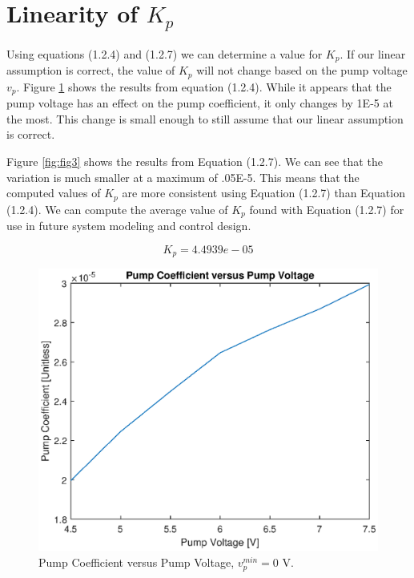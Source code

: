 \documentclass[12pt]{article}
\numberwithin{equation}{section}
\begin{document}
  \section{Linearity of $ K_p $}

  Using equations (1.2.4) and (1.2.7) we can determine a value for $ K_p. $ If our linear assumption is correct, the value of $ K_p $ will not change based on the pump voltage $ v_p. $ Figure \ref{fig:fig2} shows the results from equation (1.2.4). While it appears that the pump voltage has an effect on the pump coefficient, it only changes by 1E-5 at the most. This change is small enough to still assume that our linear assumption is correct.

  Figure \ref{fig:fig3} shows the results from Equation (1.2.7). We can see that the variation is much smaller at a maximum of .05E-5. This means that the computed values of $ K_p $ are more consistent using Equation (1.2.7) than Equation (1.2.4). We can compute the average value of $ K_p $ found with Equation (1.2.7) for use in future system modeling and control design.

  \begin{equation}
    K_p = 4.4939e-05
  \end{equation}

  \begin{figure}
    \centering
    \includegraphics[width=\textwidth]{figures/figure2}
    \caption{Pump Coefficient versus Pump Voltage, $ v_p^{min} = 0 \text { V}. $}
    \label{fig:fig2}
  \end{figure}
\end{document}
